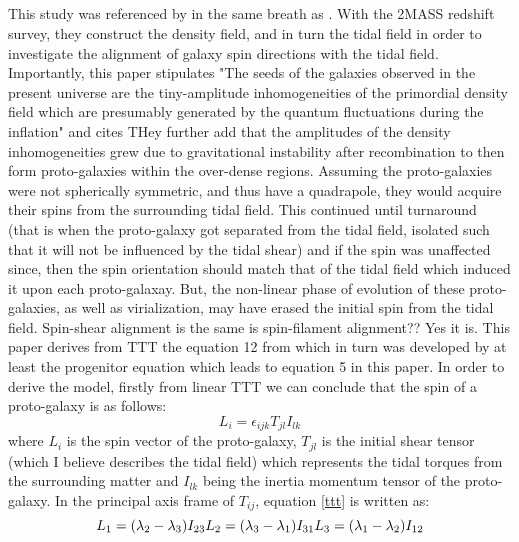 \documentclass[fleqn,usenatbib]{mnras}
\begin{document}
\subsection{\citet{Lee_Erdogdu_07}}\label{Lee_Erdogdu_07}
This study was referenced by \citet{Trowland_13} in the same breath as \citet{Lee_pen_00}.
With the 2MASS redshift survey, they construct the density field, and in turn the tidal field in order to investigate the alignment of galaxy spin directions with the tidal field. 
Importantly, this paper stipulates "The seeds of the galaxies observed in the present universe are the tiny-amplitude inhomogeneities of the primordial density field which are presumably generated by the quantum fluctuations during the inflation" and cites \citet{Guth_82}
THey further add that the amplitudes of the density inhomogeneities grew due to gravitational instability after recombination to then form proto-galaxies within the over-dense regions. Assuming the proto-galaxies were not spherically symmetric, and thus have a quadrapole, they would acquire their spins from the surrounding tidal field. This continued until turnaround (that is when the proto-galaxy got separated from the tidal field, isolated such that it will not be influenced by the tidal shear) and if the spin was unaffected since, then the spin orientation should match that of the tidal field which induced it upon each proto-galaxay. But, the non-linear phase of evolution of these proto-galaxies, as well as virialization, may have erased the initial spin from the tidal field.
Spin-shear alignment is the same is spin-filament alignment?? Yes it is.
This paper derives from TTT the equation 12 from \citet{Trowland_13} which in turn was developed by \citet{Lee_05} at least the progenitor equation which leads to equation 5 in this paper. 
In order to derive the model, firstly from linear TTT we can conclude that the spin of a proto-galaxy is as follows:
\begin{equation}
L_{i}=\epsilon_{ijk}T_{jl}I_{lk} \label{ttt}
\end{equation}
where $L_{i}$ is the spin vector of the proto-galaxy, $T_{jl}$ is the initial shear tensor (which I believe describes the tidal field) which represents the tidal torques from the surrounding matter and $I_{lk}$ being the inertia momentum tensor of the proto-galaxy. In the principal axis frame of $T_{ij}$, equation \ref{ttt} is written as:
\begin{equation}
L_{1}=(\lambda_{2}-\lambda_{3})I_{23}\\
L_{2}=(\lambda_{3}-\lambda_{1})I_{31}\\ \label{prin}
L_{3}=(\lambda_{1}-\lambda_{2})I_{12}
\end{equation}
\end{document}
